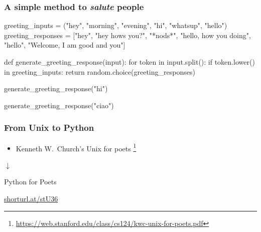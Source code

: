 \documentclass[handout]{beamer}
\begin{document}
\begin{frame}[fragile]
\frametitle{A simple method to \textit{salute} people}
\vspace{5mm}

\begin{python}
greeting_inputs = ("hey", "morning", "evening", "hi",
                "whatsup", "hello")
greeting_responses = ["hey", "hey hows you?", "*nods*",
                "hello, how you doing", "hello",
                "Welcome, I am good and you"]

def generate_greeting_response(input):
    for token in input.split():
        if token.lower() in greeting_inputs:
            return random.choice(greeting_responses)
\end{python}
\pause

\begin{python}
generate_greeting_response("hi")
\end{python}
\pause

\begin{python}
generate_greeting_response("ciao")
\end{python}

\end{frame}

\begin{frame}
\frametitle{From Unix to Python}

\begin{itemize}
  \item Kenneth W.\ Church's \alert{Unix for poets}%
  \footnote{\url{https://web.stanford.edu/class/cs124/kwc-unix-for-poets.pdf}}
\end{itemize}
\medskip
\pause

\centering

$\downarrow$
\medskip

\alert{Python for Poets}

\pause

\bigskip
\centering
\url{shorturl.at/stU36}


\end{frame}
\end{document}
